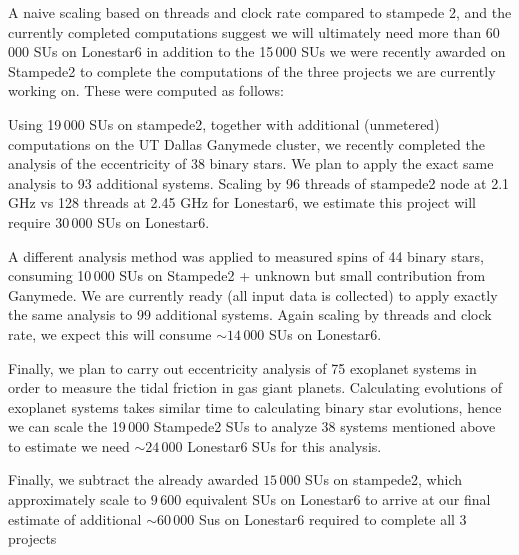 \documentclass{article}
\begin{document}
A naive scaling based on threads and clock rate compared to stampede 2, and the
currently completed computations suggest we will ultimately need more than
60\,000 SUs on Lonestar6 in addition to the 15\,000 SUs we were recently awarded
on Stampede2 to complete the computations of the three projects we are currently
working on. These were computed as follows:

Using 19\,000 SUs on stampede2, together with additional (unmetered)
computations on the UT Dallas Ganymede cluster, we recently completed the
analysis of the eccentricity of 38 binary stars. We plan to apply the exact same
analysis to 93 additional systems. Scaling by 96 threads of stampede2 node at
2.1 GHz vs 128 threads at 2.45 GHz for Lonestar6, we estimate this project will
require 30\,000 SUs on Lonestar6. 

A different analysis method was applied to measured spins of 44 binary stars,
consuming 10\,000 SUs on Stampede2 + unknown but small contribution from
Ganymede. We are currently ready (all input data is collected) to apply exactly
the same analysis to 99 additional systems. Again scaling by threads and clock
rate, we expect this will consume $\sim14\,000$ SUs on Lonestar6.

Finally, we plan to carry out eccentricity analysis of 75 exoplanet systems in
order to measure the tidal friction in gas giant planets. Calculating
evolutions of exoplanet systems takes similar time to calculating binary star
evolutions, hence we can scale the 19\,000 Stampede2 SUs to analyze 38 systems
mentioned above to estimate we need $\sim24\,000$ Lonestar6 SUs for this
analysis.

Finally, we subtract the already awarded $15\,000$ SUs on stampede2, which
approximately scale to $9\,600$ equivalent SUs on Lonestar6 to arrive at our
final estimate of additional $\sim60\,000$ Sus on Lonestar6 required to complete
all 3 projects
\end{document}
